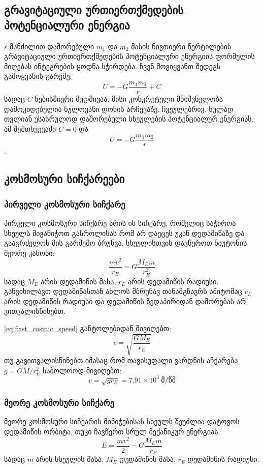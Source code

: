\documentclass{book}
\begin{document}
\subsection{გრავიტაციული ურთიერთქმედების პოტენციალური ენერგია}
	$r$ მანძილით დაშორებული $m_1$ და $m_2$ მასის ნივთიერი წერტილების გრავიტაციული ურთიერთქმედების პოტენციალური ენერგიის ფორმულის მიღებას ინტეგრების ცოდნა სჭირდება. ჩვენ მოვიყვანთ შედეგს გამოყვანის გარეშე:
	\begin{equation}
		U = -G\frac{m_1 m_2}{r} + C
	\end{equation}
სადაც $C$ ნებისმიერი მუდმივაა. მისი კონკრეტული მნიშვნელობა დამოკიდებულია ნულოვანი დონის არჩევაზე. ჩვეულებრივ, ნულად თვლიან
უსასრულოდ დაშორებული სხეულების პოტენციალურ ენერგიას. ამ შემთხვევაში	$C = 0$ და $$U = -G\frac{m_1 m_2}{r}$$.
	
\subsection{კოსმოსური სიჩქარეები}
\subsubsection{პირველი კოსმოსური სიჩქარე}
პირველი კოსმოსური სიჩქარე არის ის სიჩქარე, რომელიც საჭიროა სხეულს მივანიჭოთ გასროლისას რომ არ დაეცეს უკან დედამიწაზე და გააგრძელოს მის გარშემო ბრუნვა. სხეულისთვის დავწეროთ ნიუტონის მეორე კანონი:
		\begin{equation}
			\frac{mv^2}{r_E} = G\frac{M_Em}{r_E^2}
			\label{eq:first_cosmic_speed}
		\end{equation}
სადაც $M_E$ არის დედამიწის მასა, $r_E$ არის დედამიწის რადიუსი. განვიხილავთ დედამიწასთან ახლოს მბრუნავ თანამგზავრს ამიტომაც $r_E$ არის დედამიწის რადიუსი და დედამიწის ზედაპირიდან დაშორებას არ ვითვალისწინებთ.

\ref{eq:first_cosmic_speed} განტოლებიდან მივიღებთ:
	\begin{equation}
		v = \sqrt{\frac{G M_E}{r_E}}
	\end{equation}
თუ გავითვალისწინებთ იმასაც რომ თავისუფალი ვარდნის აჩქარება $g = GM/r_E^2$ საბოლოოდ მივიღებთ:
	\begin{equation}
		v = \sqrt{g r_E} = 7.91 \times 10^3 ~ \text{მ/წმ}
	\end{equation}
	
\subsubsection{მეორე კოსმოსური სიჩქარე}
მეორე კოსმოსური სიჩქარის მინიჭებისას სხეულს შეუძლია დატოვოს დედამიწის ორბიტა, თუკი ჩავწერთ სრულ მექანიკურ ენერგიას. 
			\begin{equation}
				E = \frac{mv^2}{2} - G\frac{M_E m}{r_E}
			\end{equation}
სადაც $m$ არის სხეულის მასა, $M_E$ დედამიწის მასა, $r_E$ დედამიწის რადიუსი. 
\end{document}
